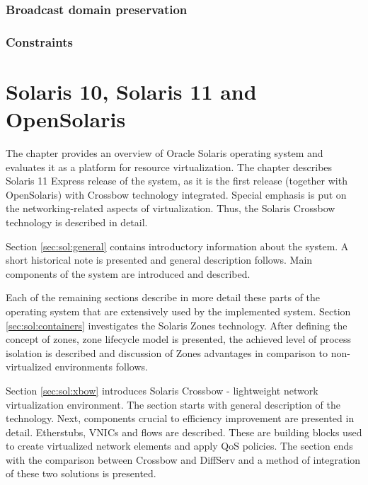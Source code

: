 \documentclass[11pt]{book}
\begin{document}
      \subsection{Broadcast domain preservation}

	  
		

      \subsection{Constraints}


  \chapter{Solaris 10, Solaris 11 and OpenSolaris}
  

    The chapter provides an overview of Oracle Solaris operating system and evaluates it as a platform for resource
    virtualization. The chapter describes Solaris 11 Express release of the system, as it is the first release
    (together with OpenSolaris) with Crossbow technology integrated. Special emphasis is put on the networking-related
    aspects of virtualization. Thus, the Solaris Crossbow technology is described in detail.

    Section \ref{sec:sol:general} contains introductory information about the system. A short historical note is
    presented and general description follows. Main components of the system are introduced and described.
    
    Each of the remaining sections describe in more detail these parts of the operating system that are extensively
    used by the implemented system. Section \ref{sec:sol:containers} investigates the Solaris Zones technology. After
    defining the concept of zones, zone lifecycle model is presented, the achieved level of process isolation is
    described and discussion of Zones advantages in comparison to non-virtualized environments follows.

    Section \ref{sec:sol:xbow} introduces Solaris Crossbow - lightweight network virtualization environment. The
    section starts with general description of the technology. Next, components crucial to efficiency improvement are
    presented in detail. Etherstubs, VNICs and flows are described. These are building blocks used to create
    virtualized network elements and apply QoS policies. The section ends with the comparison between Crossbow and
    DiffServ and a method of integration of these two solutions is presented.
\end{document}
